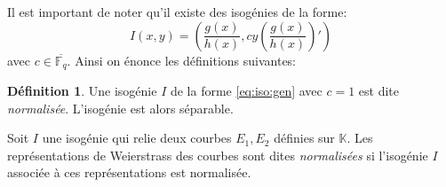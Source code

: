 \documentclass[10pt,a4paper]{book}
\theoremstyle{plain}
\theoremstyle{definition}
\theoremstyle{definition}
\theoremstyle{definition}
\theoremstyle{definition}
\theoremstyle{definition}
\newtheorem{defi}[thm]{Définition}
\theoremstyle{remark}
\theoremstyle{remark}
\theoremstyle{definition}
\begin{document}
Il est important de noter qu'il existe des isogénies de la forme:
\begin{equation}
\label{eq:iso:gen}
I(x,y)=\left( \frac{g(x)}{h(x)},cy \left( \frac{g(x)}{h(x)} \right)' \right)
\end{equation}
avec $c \in \overline{\mathbb{F}_q}$. Ainsi on énonce les définitions suivantes:


\begin{defi}
Une isogénie $I$ de la forme \eqref{eq:iso:gen} avec $c=1$ est dite 
\emph{normalisée}. L'isogénie est alors séparable. 

Soit $I$ une isogénie qui relie deux courbes $E_1,E_2$ définies sur 
$\mathbb{K}$. Les représentations de Weierstrass des courbes sont dites 
\emph{normalisées} si l'isogénie $I$ associée à ces représentations est 
normalisée.
\end{defi}
\end{document}
